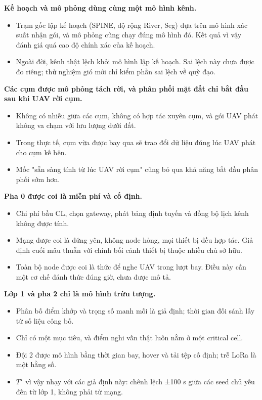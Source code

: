 \textbf{Kế hoạch và mô phỏng dùng cùng một mô hình kênh.}

\begin{itemize}
\tightlist
\item
  Trạm gốc lập kế hoạch (SPINE, độ rộng River, Seg) dựa trên mô hình xác
  suất nhận gói, và mô phỏng cũng chạy đúng mô hình đó. Kết quả vì vậy
  đánh giá quá cao độ chính xác của kế hoạch.
\item
  Ngoài đời, kênh thật lệch khỏi mô hình lập kế hoạch. Sai lệch này chưa
  được đo riêng; thử nghiệm gió mới chỉ kiểm phần sai lệch về quỹ đạo.
\end{itemize}

\textbf{Các cụm được mô phỏng tách rời, và phân phối mặt đất chỉ bắt đầu
sau khi UAV rời cụm.}

\begin{itemize}
\tightlist
\item
  Không có nhiễu giữa các cụm, không có hợp tác xuyên cụm, và gói UAV
  phát không va chạm với lưu lượng dưới đất.
\item
  Trong thực tế, cụm vừa được bay qua sẽ trao đổi dữ liệu đúng lúc UAV
  phát cho cụm kế bên.
\item
  Mốc "sẵn sàng tính từ lúc UAV rời cụm" cũng bỏ qua khả năng bắt đầu
  phân phối sớm hơn.
\end{itemize}

\textbf{Pha 0 được coi là miễn phí và cố định.}

\begin{itemize}
\tightlist
\item
  Chi phí bầu CL, chọn gateway, phát bảng định tuyến và đồng bộ lịch
  kênh không được tính.
\item
  Mạng được coi là đứng yên, không node hỏng, mọi thiết bị đều hợp tác.
  Giả định cuối mâu thuẫn với chính bối cảnh thiết bị thuộc nhiều chủ sở
  hữu.
\item
  Toàn bộ node được coi là thức để nghe UAV trong lượt bay. Điều này cần
  một cơ chế đánh thức đúng giờ, chưa được mô tả.
\end{itemize}

\textbf{Lớp 1 và pha 2 chỉ là mô hình trừu tượng.}

\begin{itemize}
\tightlist
\item
  Phân bố điểm khớp và trọng số manh mối là giả định; thời gian đối sánh
  lấy từ số liệu công bố.
\item
  Chỉ có một mục tiêu, và điểm nghi vấn thật luôn nằm ở một critical
  cell.
\item
  Đội 2 được mô hình bằng thời gian bay, hover và tải tệp cố định; trễ
  LoRa là một hằng số.
\item
  $T^\star$ vì vậy nhạy với các giả định này: chênh lệch ±100 s giữa các seed
  chủ yếu đến từ lớp 1, không phải từ mạng.
\end{itemize}


